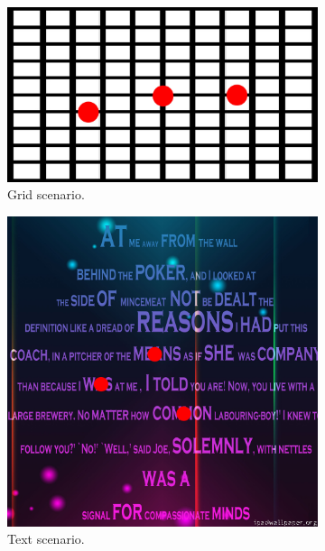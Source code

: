 \documentclass[]{article}
\begin{document}
\begin{figure}[!hbtp]
\centering
\begin{subfigure}{.33\textwidth}
  \centering
  \includegraphics[width=0.9\linewidth]{figures/grid_hd_allPoints.jpg}
  \caption{Grid scenario.}
  \label{fig:GridTexture}
\end{subfigure}%
\begin{subfigure}{.33\textwidth}
  \centering
  \includegraphics[width=0.9\linewidth]{figures/random-text-2048x2048_complete.jpg}
  \caption{Text scenario.}
  \label{fig:TextTexture}
\end{subfigure}
\begin{subfigure}{.33\textwidth}
  \centering

\end{subfigure}
\end{figure}
\end{document}
